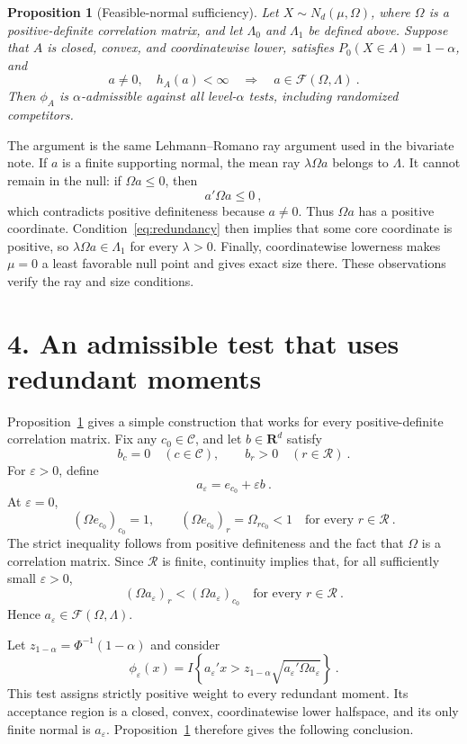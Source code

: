\documentclass[12pt]{article}
\newtheorem{proposition}{Proposition}
\theoremstyle{remark}
\begin{document}
\begin{proposition}[Feasible-normal sufficiency]\label{prop:sufficiency}
Let $X\sim N_d(\mu,\Omega)$, where $\Omega$ is a positive-definite correlation matrix,
and let $\Lambda_0$ and $\Lambda_1$ be defined above.  Suppose that $A$ is closed,
convex, and coordinatewise lower, satisfies $P_0(X\in A)=1-\alpha$, and
\[
a\ne0,\quad h_A(a)<\infty
\quad\Longrightarrow\quad
a\in\mathcal F(\Omega,\Lambda)~.
\]
Then $\phi_A$ is $\alpha$-admissible against all level-$\alpha$ tests, including
randomized competitors.
\end{proposition}

The argument is the same Lehmann--Romano ray argument used in the bivariate note.  If
$a$ is a finite supporting normal, the mean ray $\lambda\Omega a$ belongs to $\Lambda$.
It cannot remain in the null: if $\Omega a\le0$, then
\[
a'\Omega a\le0~,
\]
which contradicts positive definiteness because $a\ne0$.  Thus $\Omega a$ has a
positive coordinate.  Condition~\eqref{eq:redundancy} then implies that some core
coordinate is positive, so $\lambda\Omega a\in\Lambda_1$ for every $\lambda>0$.
Finally, coordinatewise lowerness makes $\mu=0$ a least favorable null point and gives
exact size there.  These observations verify the ray and size conditions.

\section*{4. An admissible test that uses redundant moments}

Proposition~\ref{prop:sufficiency} gives a simple construction that works for every
positive-definite correlation matrix.  Fix any $c_0\in\mathcal C$, and let
$b\in\mathbf R^d$ satisfy
\[
b_c=0\quad(c\in\mathcal C),
\qquad
b_r>0\quad(r\in\mathcal R)~.
\]
For $\varepsilon>0$, define
\[
a_\varepsilon=e_{c_0}+\varepsilon b~.
\]
At $\varepsilon=0$,
\[
(\Omega e_{c_0})_{c_0}=1,
\qquad
(\Omega e_{c_0})_r=\Omega_{r c_0}<1
\quad\text{for every }r\in\mathcal R~.
\]
The strict inequality follows from positive definiteness and the fact that $\Omega$ is
a correlation matrix.  Since $\mathcal R$ is finite, continuity implies that, for all
sufficiently small $\varepsilon>0$,
\[
(\Omega a_\varepsilon)_r
<
(\Omega a_\varepsilon)_{c_0}
\quad\text{for every }r\in\mathcal R~.
\]
Hence $a_\varepsilon\in\mathcal F(\Omega,\Lambda)$.

Let $z_{1-\alpha}=\Phi^{-1}(1-\alpha)$ and consider
\begin{equation}\label{eq:augmented-test}
\phi_\varepsilon(x)
=
I\left\{
a_\varepsilon'x>
z_{1-\alpha}\sqrt{a_\varepsilon'\Omega a_\varepsilon}
\right\}~.
\end{equation}
This test assigns strictly positive weight to every redundant moment.  Its acceptance
region is a closed, convex, coordinatewise lower halfspace, and its only finite normal
is $a_\varepsilon$.  Proposition~\ref{prop:sufficiency} therefore gives the following
conclusion.
\end{document}

